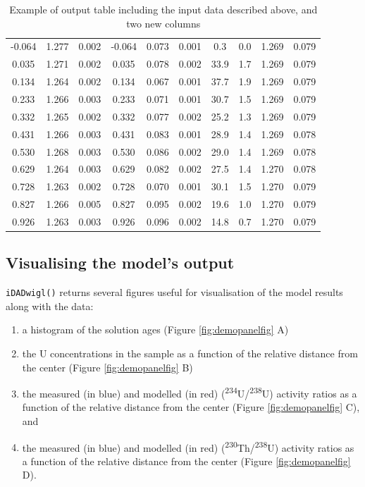 \documentclass[]{elsarticle} %
\providecommand{\tightlist}{%
  \setlength{\itemsep}{0pt}\setlength{\parskip}{0pt}}
\begin{document}
\begin{table}[ht]
\begin{tabular}{cccccccccc}
  -0.064 & 1.277 & 0.002 & -0.064 & 0.073 & 0.001 & 0.3 & 0.0 & 1.269 & 0.079 \\ 
  0.035 & 1.271 & 0.002 & 0.035 & 0.078 & 0.002 & 33.9 & 1.7 & 1.269 & 0.079 \\ 
  0.134 & 1.264 & 0.002 & 0.134 & 0.067 & 0.001 & 37.7 & 1.9 & 1.269 & 0.079 \\ 
  0.233 & 1.266 & 0.003 & 0.233 & 0.071 & 0.001 & 30.7 & 1.5 & 1.269 & 0.079 \\ 
  0.332 & 1.265 & 0.002 & 0.332 & 0.077 & 0.002 & 25.2 & 1.3 & 1.269 & 0.079 \\ 
  0.431 & 1.266 & 0.003 & 0.431 & 0.083 & 0.001 & 28.9 & 1.4 & 1.269 & 0.078 \\ 
  0.530 & 1.268 & 0.003 & 0.530 & 0.086 & 0.002 & 29.0 & 1.4 & 1.269 & 0.078 \\ 
  0.629 & 1.264 & 0.003 & 0.629 & 0.082 & 0.002 & 27.5 & 1.4 & 1.270 & 0.078 \\ 
  0.728 & 1.263 & 0.002 & 0.728 & 0.070 & 0.001 & 30.1 & 1.5 & 1.270 & 0.079 \\ 
  0.827 & 1.266 & 0.005 & 0.827 & 0.095 & 0.002 & 19.6 & 1.0 & 1.270 & 0.079 \\ 
  0.926 & 1.263 & 0.003 & 0.926 & 0.096 & 0.002 & 14.8 & 0.7 & 1.270 & 0.079 \\ 
   \hline
\end{tabular}
\caption{\label{tab:outputdata}Example of output table including the input data described above, and two new columns} 
\end{table}

\newpage

\hypertarget{visualising-the-models-output}{%
\subsection{Visualising the model's output}\label{visualising-the-models-output}}

\texttt{iDADwigl()} returns several figures useful for visualisation of the model results along with the data:

\begin{enumerate}
\def\labelenumi{\arabic{enumi}.}
\tightlist
\item
  a histogram of the solution ages (Figure \ref{fig:demopanelfig} A)
\item
  the U concentrations in the sample as a function of the relative distance from the center (Figure \ref{fig:demopanelfig} B)
\item
  the measured (in blue) and modelled (in red) (\textsuperscript{234}U/\textsuperscript{238}U) activity ratios as a function of the relative distance from the center (Figure \ref{fig:demopanelfig} C), and
\item
  the measured (in blue) and modelled (in red) (\textsuperscript{230}Th/\textsuperscript{238}U) activity ratios as a function of the relative distance from the center (Figure \ref{fig:demopanelfig} D).
\end{enumerate}
\end{document}
